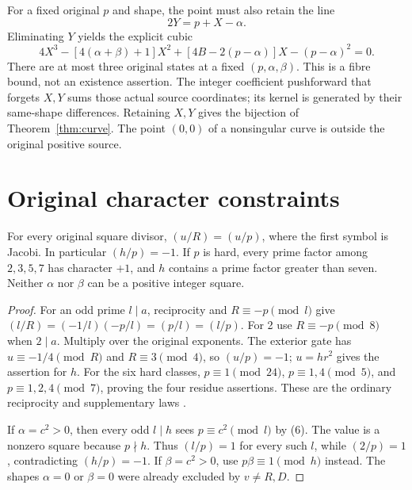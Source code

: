 For a fixed original $p$ and shape, the point must also retain the line
\[
 \boxed{2Y=p+X-\alpha.}                                  \tag{8}
\]
Eliminating $Y$ yields the explicit cubic
\[
 4X^3-[4(\alpha+\beta)+1]X^2+
 [4B-2(p-\alpha)]X-(p-\alpha)^2=0.                        \tag{9}
\]
There are at most three original states at a fixed $(p,\alpha,\beta)$.
This is a fibre bound, not an existence assertion. The integer coefficient
pushforward that forgets $X,Y$ sums those actual source coordinates; its kernel
is generated by their same-shape differences. Retaining $X,Y$ gives the
bijection of Theorem~\ref{thm:curve}. The point $(0,0)$ of a nonsingular curve is
outside the original positive source.

\section{Original character constraints}
\begin{lemma}\label{lem:char}
For every original square divisor, $(u/R)=(u/p)$, where the first symbol is
Jacobi. In particular $(h/p)=-1$. If $p$ is hard, every prime factor among
$2,3,5,7$ has character $+1$, and $h$ contains a prime factor greater than seven.
Neither $\alpha$ nor $\beta$ can be a positive integer square.
\end{lemma}
\begin{proof}
For an odd prime $l\mid a$, reciprocity and $R\equiv-p\pmod l$ give
$(l/R)=(-1/l)(-p/l)=(p/l)=(l/p)$. For 2 use $R\equiv-p\pmod8$ when $2\mid a$.
Multiply over the original exponents. The exterior gate has $u\equiv-1/4\pmod R$
and $R\equiv3\pmod4$, so $(u/p)=-1$; $u=hr^2$ gives the assertion for $h$.
For the six hard classes, $p\equiv1\pmod{24}$, $p\equiv1,4\pmod5$, and
$p\equiv1,2,4\pmod7$, proving the four residue assertions.
These are the ordinary reciprocity and supplementary laws \cite[\S6.4]{Hatcher}.

If $\alpha=c^2>0$, then every odd $l\mid h$ sees $p\equiv c^2\pmod l$ by (6).
The value is a nonzero square because $p\nmid h$. Thus $(l/p)=1$ for every such
$l$, while $(2/p)=1$, contradicting $(h/p)=-1$. If $\beta=c^2>0$, use
$p\beta\equiv1\pmod h$ instead. The shapes $\alpha=0$ or $\beta=0$ were already
excluded by $v\ne R,D$.
\end{proof}

